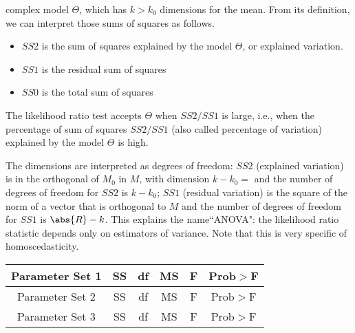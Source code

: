 complex model $\Theta$, which has $k >k_0$ dimensions for the
mean. From its definition, we can interpret those sums of
squares as follows.
\begin{itemize}
  \item $SS2$ is the sum of squares explained by the model
      $\Theta$, or explained variation.
  \item $SS1$ is the residual sum of squares
\item $SS0$ is the total sum of squares
\end{itemize}
  The likelihood ratio test accepts $\Theta$ when $SS2/SS1$ is large, i.e., when the
percentage of sum of squares $SS2/SS1$ (also called percentage
of variation) explained by the model $\Theta$ is high.

The dimensions are interpreted as degrees of
  freedom: $SS2$ (explained variation) is in the orthogonal of
      $M_0$ in $M$, with dimension $k-k_0=$ and the number of
      degrees of freedom for $SS2$ is $k-k_0$; $SS1$ (residual variation) is the square of
      the norm of a vector that is orthogonal to
      $M$ and the number of degrees of freedom
      for $SS1$ is $\abs{R}-k$.
This explains the name``ANOVA": the likelihood ratio statistic
depends only on estimators of variance. Note that this is very
specific of homoscedasticity.
\begin{table}
 \center
  \begin{tabular}{c|c|c|c|c|c}\hline
     Parameter Set 1 & SS & df & MS & F & Prob$>$F \\ \hline
    
    \hline
  \hline
     Parameter Set 2 & SS & df & MS & F & Prob$>$F \\ \hline
    
    \hline
  \hline
     Parameter Set 3 & SS & df & MS & F & Prob$>$F \\ \hline
    
    \hline
  \end{tabular}\\
\end{table}
